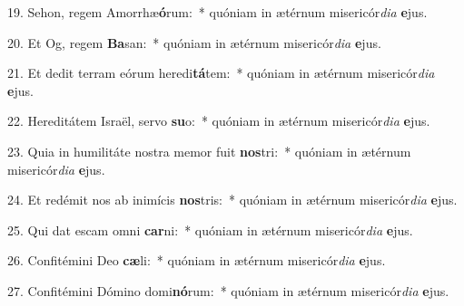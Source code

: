 19. Sehon, regem Amorrhæ\textbf{ó}rum:~*  quóniam in ætérnum misericór\textit{di}\textit{a} \textbf{e}jus.\

20. Et Og, regem \textbf{Ba}san:~*  quóniam in ætérnum misericór\textit{di}\textit{a} \textbf{e}jus.\

21. Et dedit terram eórum heredi\textbf{tá}tem:~*  quóniam in ætérnum misericór\textit{di}\textit{a} \textbf{e}jus.\

22. Hereditátem Israël, servo \textbf{su}o:~*  quóniam in ætérnum misericór\textit{di}\textit{a} \textbf{e}jus.\

23. Quia in humilitáte nostra memor fuit \textbf{nos}tri:~*  quóniam in ætérnum misericór\textit{di}\textit{a} \textbf{e}jus.\

24. Et redémit nos ab inimícis \textbf{nos}tris:~*  quóniam in ætérnum misericór\textit{di}\textit{a} \textbf{e}jus.\

25. Qui dat escam omni \textbf{car}ni:~*  quóniam in ætérnum misericór\textit{di}\textit{a} \textbf{e}jus.\

26. Confitémini Deo \textbf{cæ}li:~*  quóniam in ætérnum misericór\textit{di}\textit{a} \textbf{e}jus.\

27. Confitémini Dómino domi\textbf{nó}rum:~*  quóniam in ætérnum misericór\textit{di}\textit{a} \textbf{e}jus.\

